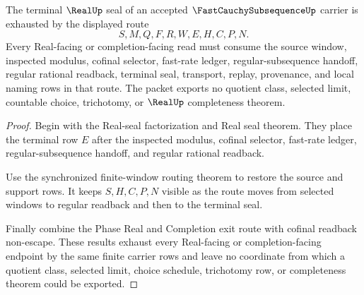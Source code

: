 \begin{theorem}
\label{thm:fast-cauchy-subsequence-seal-boundary-exhaustion}
The terminal $\RealUp$ seal of an accepted $\FastCauchySubsequenceUp$ carrier is exhausted by the displayed route
$$
S,M,Q,F,R,W,E,H,C,P,N .
$$
Every Real-facing or completion-facing read must consume the source window, inspected modulus, cofinal selector, fast-rate ledger, regular-subsequence handoff, regular rational readback, terminal seal, transport, replay, provenance, and local naming rows in that route. The packet exports no quotient class, selected limit, countable choice, trichotomy, or $\RealUp$ completeness theorem.
\end{theorem}
\begin{proof}
Begin with the Real-seal factorization and Real seal theorem. They place the terminal row $E$ after the inspected modulus, cofinal selector, fast-rate ledger, regular-subsequence handoff, and regular rational readback.

Use the synchronized finite-window routing theorem to restore the source and support rows. It keeps $S,H,C,P,N$ visible as the route moves from selected windows to regular readback and then to the terminal seal.

Finally combine the Phase Real and Completion exit route with cofinal readback non-escape. These results exhaust every Real-facing or completion-facing endpoint by the same finite carrier rows and leave no coordinate from which a quotient class, selected limit, choice schedule, trichotomy row, or completeness theorem could be exported.
\end{proof}

